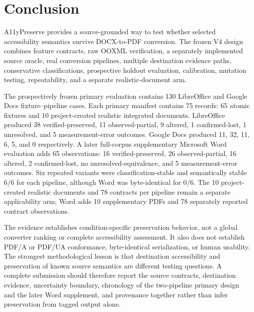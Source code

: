 \section{Conclusion}
\label{sec:conclusion}

A11yPreserve provides a source-grounded way to test whether selected accessibility semantics survive DOCX-to-PDF conversion. The frozen V4 design combines feature contracts, raw OOXML verification, a separately implemented source oracle, real conversion pipelines, multiple destination evidence paths, conservative classifications, prospective holdout evaluation, calibration, mutation testing, repeatability, and a separate realistic-document arm.

The prospectively frozen primary evaluation contains 130 LibreOffice and Google Docs fixture--pipeline cases. Each primary manifest contains 75 records: 65 atomic fixtures and 10 project-created realistic integrated documents. LibreOffice produced 38 verified-preserved, 11 observed-partial, 9 altered, 1 confirmed-lost, 1 unresolved, and 5 measurement-error outcomes. Google Docs produced 11, 32, 11, 6, 5, and 0 respectively. A later full-corpus supplementary Microsoft Word evaluation adds 65 observations: 16 verified-preserved, 26 observed-partial, 16 altered, 2 confirmed-lost, no unresolved-equivalence, and 5 measurement-error outcomes. Six repeated variants were classification-stable and semantically stable 6/6 for each pipeline, although Word was byte-identical for 0/6. The 10 project-created realistic documents and 78 contracts per pipeline remain a separate applicability arm; Word adds 10 supplementary PDFs and 78 separately reported contract observations.

The evidence establishes condition-specific preservation behavior, not a global converter ranking or complete accessibility assessment. It also does not establish PDF/A or PDF/UA conformance, byte-identical serialization, or human usability. The strongest methodological lesson is that destination accessibility and preservation of known source semantics are different testing questions. A complete submission should therefore report the source contracts, destination evidence, uncertainty boundary, chronology of the two-pipeline primary design and the later Word supplement, and provenance together rather than infer preservation from tagged output alone.
